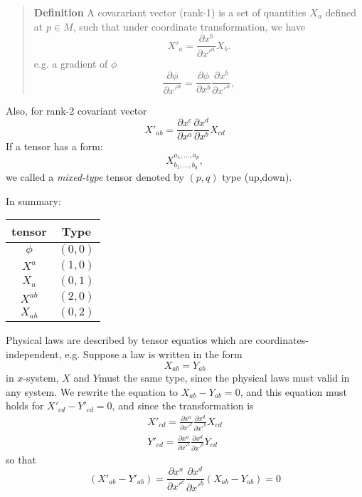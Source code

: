 \begin{quote}
	\textbf{Definition}
A covarariant vector (rank-1) is a set of quantities $X_a$ defined at $p\in M$, such that under coordinate transformation, we have
\begin{equation}
X'_{a} = \frac{\partial x^b}{\partial x'^a} X_b.
\end{equation}
e.g. a gradient of $\phi$
\begin{equation}
\frac{\partial \phi}{\partial x'^{a}} = \frac{\partial \phi}{\partial x^{b}} \frac{\partial x^{b}}{\partial x'^{a}},
\end{equation}

\end{quote}
Also, for rank-2 covariant vector 
\begin{equation}
X'_{ab} = \frac{\partial x^{c}}{\partial x^{a}} \frac{\partial x^{d}}{\partial x^{b}} X_{cd}
\end{equation}
If a tensor has a form:
\begin{equation}
X^{a_1,\ldots,a_{p}}_{b_1,\ldots,b_q},
\end{equation}
we called a \textit{mixed-type} tensor denoted by $(p,q)$ type (up,down).

In summary:

\begin{table}[htbp]
\centering
\begin{tabular}{cc}
\hline
tensor & Type \\ \hline
$\phi$ & $(0,0)$ \\
$X^{a}$ & $(1,0)$ \\
$X_{a}$ & $(0,1)$ \\
$X^{ab}$ & $(2,0)$ \\
$X_{ab}$ & $(0,2)$ \\
\hline
\end{tabular}
\end{table}


Physical laws are described by tensor equatios which are coordinates-independent, e.g. Suppose a law is written in the form
\begin{equation}
X_{ab} = Y_{ab}
\end{equation}
in $x$-system, $X$ and $Y$must the same type, since the physical laws must valid in any system. We rewrite the equation to $X_{ab} - Y_{ab} = 0$, and this equation must holds for $X'_{cd} - Y'_{cd} = 0$, and since the transformation is 
\begin{equation}
\begin{aligned}
X'_{cd} = \frac{\partial x^{a}}{\partial x'^{c}} \frac{\partial x^{d}}{\partial x'^{b}} X_{cd}\\
Y'_{cd} = \frac{\partial x^{a}}{\partial x'^{c}} \frac{\partial x^{d}}{\partial x'^{b}} Y_{cd}
\end{aligned}
\end{equation}
so that
\begin{equation}
\left(X'_{ab} - Y'_{ab}\right) = \frac{\partial x^{a}}{\partial x'^{c}} \frac{\partial x^{d}}{\partial x'^{b}}  \left(X_{ab} - Y_{ab}\right) = 0
\end{equation}


